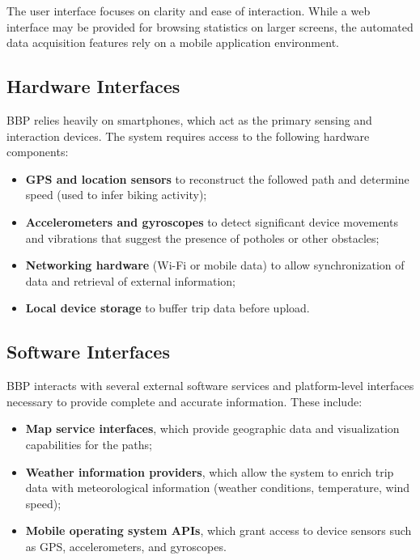 \par The user interface focuses on clarity and ease of interaction. While a web interface may be provided for browsing statistics on larger screens, the automated data acquisition features rely on a mobile application environment.

\subsection{Hardware Interfaces}
\label{subsec:hardware-interfaces}

\par BBP relies heavily on smartphones, which act as the primary sensing and interaction devices. The system requires access to the following hardware components:

\begin{itemize}
    \item \textbf{GPS and location sensors} to reconstruct the followed path and determine speed (used to infer biking activity);
    \item \textbf{Accelerometers and gyroscopes} to detect significant device movements and vibrations that suggest the presence of potholes or other obstacles;
    \item \textbf{Networking hardware} (Wi-Fi or mobile data) to allow synchronization of data and retrieval of external information;
    \item \textbf{Local device storage} to buffer trip data before upload.
\end{itemize}

\subsection{Software Interfaces}
\label{subsec:software-interfaces}

\par BBP interacts with several external software services and platform-level interfaces necessary to provide complete and accurate information. These include:

\begin{itemize}
    \item \textbf{Map service interfaces}, which provide geographic data and visualization capabilities for the paths;
    \item \textbf{Weather information providers}, which allow the system to enrich trip data with meteorological information (weather conditions, temperature, wind speed);
    \item \textbf{Mobile operating system APIs}, which grant access to device sensors such as GPS, accelerometers, and gyroscopes.
\end{itemize}

